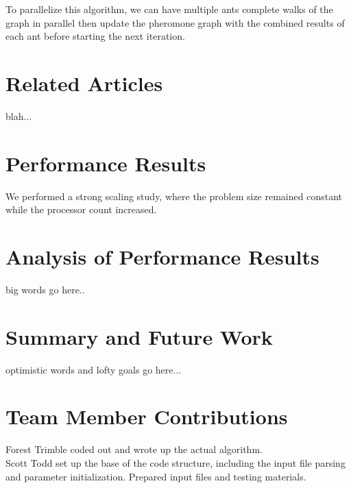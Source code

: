 \documentclass[twocolumn]{article}
\begin{document}
To parallelize this algorithm, we can have multiple ants complete walks of the
graph in parallel then update the pheromone graph with the combined results of
each ant before starting the next iteration.  \\


\section{Related Articles}

blah...\\


\section{Performance Results}

We performed a strong scaling study, where the problem size remained constant
while the processor count increased.\\


\section{Analysis of Performance Results}

big words go here..\\


\section{Summary and Future Work}

optimistic words and lofty goals go here...\\

\section{Team Member Contributions}

\noindent Forest Trimble coded out and wrote up the actual algorithm.  \\

\noindent Scott Todd set up the base of the code structure, including the input
file parsing and parameter initialization. Prepared input files and testing
materials.

\nocite{*}


\end{document}
